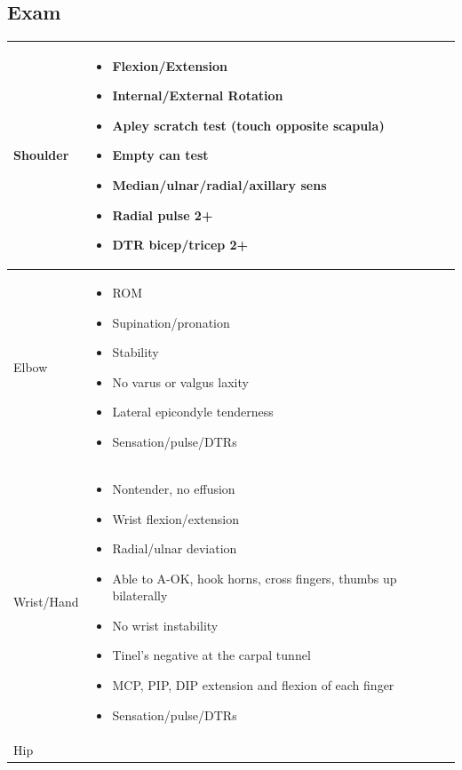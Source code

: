 \documentclass[8pt]{extarticle}
\begin{document}
\subsection{Exam}
\begin{tabularx}{\linewidth}{|X|X|}
\hline
Shoulder & 
    \begin{itemize}[leftmargin=*]
        \item[] Flexion/Extension
        \item[] Internal/External Rotation
        \item[] Apley scratch test (touch opposite scapula)
        \item[] Empty can test
        \item[] Median/ulnar/radial/axillary sens
        \item[] Radial pulse 2+
        \item[] DTR bicep/tricep 2+
    \end{itemize}\\
\hline
Elbow & 
    \begin{itemize}[leftmargin=*]
        \item[] ROM
        \item[] Supination/pronation
        \item[] Stability
        \item[] No varus or valgus laxity
        \item[] Lateral epicondyle tenderness
        \item[] Sensation/pulse/DTRs
    \end{itemize}\\
\hline
Wrist/Hand & 
    \begin{itemize}[leftmargin=*]
        \item[] Nontender, no effusion
        \item[] Wrist flexion/extension
        \item[] Radial/ulnar deviation
        \item[] Able to A-OK, hook horns, cross fingers, thumbs up bilaterally
        \item[] No wrist instability
        \item[] Tinel's negative at the carpal tunnel
        \item[] MCP, PIP, DIP extension and flexion of each finger
        \item[] Sensation/pulse/DTRs
    \end{itemize}\\
\hline
Hip & 
    \begin{itemize}[leftmargin=*]

\end{itemize}
\end{tabularx}
\end{document}
